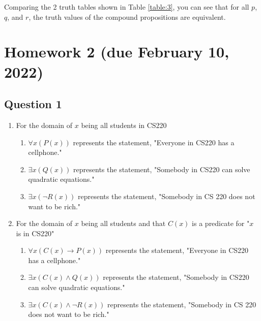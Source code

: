 \documentclass[letterpaper, 12pt]{article}
\begin{document}
Comparing the 2 truth tables shown in Table \ref{table:3}, you can see that for all $p$, $q$, and $r$, the truth values of the compound propositions are equivalent.

\section*{Homework 2 (due February 10, 2022)}

\subsection*{Question 1}
\begin{enumerate}
    \item For the domain of $x$ being all students in CS220
    \begin{enumerate}
        \item $\forall x(P(x))$ represents the statement, "Everyone in CS220 has a cellphone."
        \item $\exists x(Q(x))$ represents the statement, "Somebody in CS220 can solve quadratic equations."
        \item $\exists x(\neg R(x))$ represents the statement, "Somebody in CS 220 does not want to be rich."
    \end{enumerate}
    \item For the domain of $x$ being all students and that $C(x)$ is a predicate for "$x$ is in CS220" 
    \begin{enumerate}
        \item $\forall x(C(x) \to P(x))$ represents the statement, "Everyone in CS220 has a cellphone."
        \item $\exists x(C(x) \land Q(x))$ represents the statement, "Somebody in CS220 can solve quadratic equations."
        \item $\exists x(C(x) \land \neg R(x))$ represents the statement, "Somebody in CS 220 does not want to be rich."
    \end{enumerate}
\end{enumerate}
\end{document}
